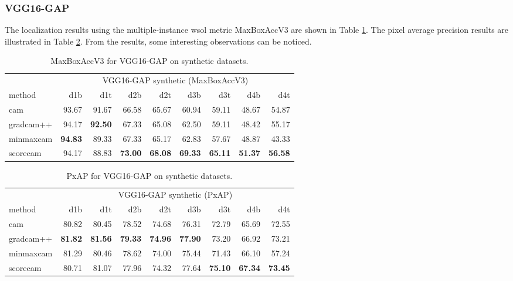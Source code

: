 \subsubsection{VGG16-GAP}
The localization results using the multiple-instance \acrshort{wsol} metric MaxBoxAccV3 are shown in Table \ref{tab:maxboxaccv3_vgg16_gap_synthetic}. The pixel average precision results are illustrated in Table \ref{tab:pxap_vgg16_gap_synthetic}. From the results, some interesting observations can be noticed.
\begin{table}[ht]
\centering
\begin{tabular}{lrrrrrrrr}
\toprule
 & \multicolumn{8}{c}{VGG16-GAP synthetic (MaxBoxAccV3)} \\
method & d1b & d1t & d2b & d2t & d3b & d3t & d4b & d4t \\
\cmidrule(lr){1-1} \cmidrule(lr){2-9} 
cam & 93.67 & 91.67 & 66.58 & 65.67 & 60.94 & 59.11 & 48.67 & 54.87 \\
gradcam++ & 94.17 & \bfseries 92.50 & 67.33 & 65.08 & 62.50 & 59.11 & 48.42 & 55.17 \\
minmaxcam & \bfseries 94.83 & 89.33 & 67.33 & 65.17 & 62.83 & 57.67 & 48.87 & 43.33 \\
scorecam & 94.17 & 88.83 & \bfseries 73.00 & \bfseries 68.08 & \bfseries 69.33 & \bfseries 65.11 & \bfseries 51.37 & \bfseries 56.58 \\
\bottomrule
\end{tabular}
\caption[MaxBoxAccV3 for VGG16-GAP on synthetic datasets]{MaxBoxAccV3 for VGG16-GAP on synthetic datasets.}
\label{tab:maxboxaccv3_vgg16_gap_synthetic}
\end{table}
\begin{table}[h]
\centering
\begin{tabular}{lrrrrrrrr}
\toprule
 & \multicolumn{8}{c}{VGG16-GAP synthetic (PxAP)} \\
method & d1b & d1t & d2b & d2t & d3b & d3t & d4b & d4t \\
\cmidrule(lr){1-1} \cmidrule(lr){2-9} 
cam & 80.82 & 80.45 & 78.52 & 74.68 & 76.31 & 72.79 & 65.69 & 72.55 \\
gradcam++ & \bfseries 81.82 & \bfseries 81.56 & \bfseries 79.33 & \bfseries 74.96 & \bfseries 77.90 & 73.20 & 66.92 & 73.21 \\
minmaxcam & 81.29 & 80.46 & 78.62 & 74.00 & 75.44 & 71.43 & 66.10 & 57.24 \\
scorecam & 80.71 & 81.07 & 77.96 & 74.32 & 77.64 & \bfseries 75.10 & \bfseries 67.34 & \bfseries 73.45 \\
\bottomrule
\end{tabular}
\caption[PxAP for VGG16-GAP on synthetic datasets]{PxAP for VGG16-GAP on synthetic datasets.}
\label{tab:pxap_vgg16_gap_synthetic}
\end{table}

